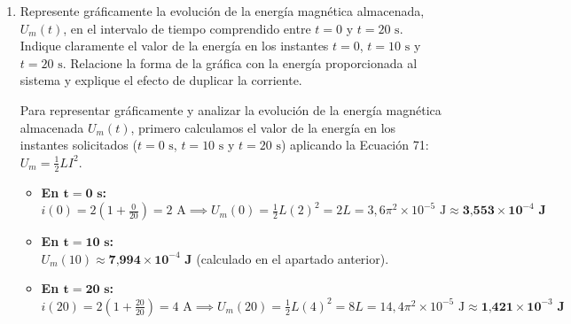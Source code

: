 \documentclass[11pt, a4paper]{article}
\newenvironment{problem}[1][Cuestión]{
	\vspace{0.5cm}
	\noindent{\Large\bfseries #1} \par\vspace{0.5cm}
}{
	\vspace{0.5cm}
}
\begin{document}
\begin{problem}[Problema]
\begin{enumerate}[label=\alph*)]
{					Primero, evaluamos la intensidad de la corriente en el instante $t = 10 \text{ s}$:
					\begin{equation*}
						i(10) = 2 \left( 1 + \frac{10}{20} \right) = 2 \cdot 1,5 = 3 \text{ A}
					\end{equation*}

					Sustituimos el valor de $L$ y el de la corriente en la Ecuación 71:
					\begin{align*}
						U_m(10) &= \frac{1}{2} \cdot (1,8 \pi^2 \times 10^{-5}) \cdot (3)^2 \\
						&= 0,9 \pi^2 \times 10^{-5} \cdot 9 \\
						&= 8,1 \pi^2 \times 10^{-5} \text{ J} \approx \textbf{7,994} \times \textbf{10}^{-4} \textbf{ J}
					\end{align*}
				}

			\item Represente gráficamente la evolución de la energía magnética almacenada, $U_m (t)$, en el intervalo de tiempo comprendido entre $t = 0$ y $t = 20 \text{ s}$. Indique claramente el valor de la energía en los instantes $t = 0$, $t = 10 \text{ s}$ y $t = 20 \text{ s}$. Relacione la forma de la gráfica con la energía proporcionada al sistema y explique el efecto de duplicar la corriente.

				{ \color{blue} 
					Para representar gráficamente y analizar la evolución de la energía magnética almacenada $U_m(t)$, primero calculamos el valor de la energía en los instantes solicitados ($t = 0 \text{ s}$, $t = 10 \text{ s}$ y $t = 20 \text{ s}$) aplicando la Ecuación 71: $U_m = \frac{1}{2} L I^2$.

					\begin{itemize}
						\item \textbf{En $\mathbf{t = 0 \text{ s}}$:} \\ 
						$i(0) = 2 \left( 1 + \frac{0}{20} \right) = 2 \text{ A} \implies U_m(0) = \frac{1}{2} L (2)^2 = 2L = 3,6 \pi^2 \times 10^{-5} \text{ J} \approx \textbf{3,553} \times \textbf{10}^{-4} \textbf{ J}$

						\item \textbf{En $\mathbf{t = 10 \text{ s}}$:} \\
						$U_m(10) \approx \textbf{7,994} \times \textbf{10}^{-4} \textbf{ J}$ (calculado en el apartado anterior).

						\item \textbf{En $\mathbf{t = 20 \text{ s}}$:} \\
						$i(20) = 2 \left( 1 + \frac{20}{20} \right) = 4 \text{ A} \implies U_m(20) = \frac{1}{2} L (4)^2 = 8L = 14,4 \pi^2 \times 10^{-5} \text{ J} \approx \textbf{1,421} \times \textbf{10}^{-3} \textbf{ J}$
					\end{itemize}

}
\end{enumerate}
\end{problem}
\end{document}
